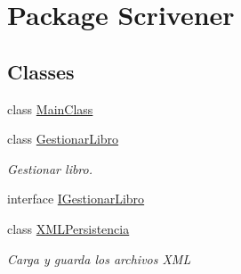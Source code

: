 \hypertarget{namespace_scrivener}{\section{Package Scrivener}
\label{namespace_scrivener}
}
\subsection*{Classes}
\begin{DoxyCompactItemize}
\item 
class \hyperlink{class_scrivener_1_1_main_class}{Main\-Class}
\item 
class \hyperlink{class_scrivener_1_1_gestionar_libro}{Gestionar\-Libro}
\begin{DoxyCompactList}\small\item\em Gestionar libro. \end{DoxyCompactList}\item 
interface \hyperlink{interface_scrivener_1_1_i_gestionar_libro}{I\-Gestionar\-Libro}
\item 
class \hyperlink{class_scrivener_1_1_x_m_l_persistencia}{X\-M\-L\-Persistencia}
\begin{DoxyCompactList}\small\item\em Carga y guarda los archivos X\-M\-L \end{DoxyCompactList}\end{DoxyCompactItemize}
